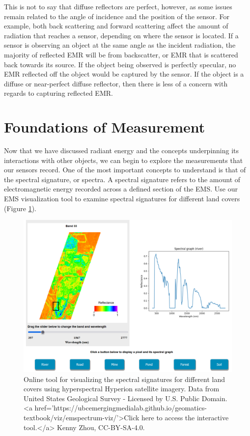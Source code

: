 \documentclass[
]{book}
\begin{document}
This is not to say that diffuse reflectors are perfect, however, as some issues remain related to the angle of incidence and the position of the sensor. For example, both back scattering and forward scattering affect the amount of radiation that reaches a sensor, depending on where the sensor is located. If a sensor is observing an object at the same angle as the incident radiation, the majority of reflected EMR will be from backscatter, or EMR that is scattered back towards its source. If the object being observed is perfectly specular, no EMR reflected off the object would be captured by the sensor. If the object is a diffuse or near-perfect diffuse reflector, then there is less of a concern with regards to capturing reflected EMR.

\section{Foundations of Measurement}\label{foundations-of-measurement}

Now that we have discussed radiant energy and the concepts underpinning its interactions with other objects, we can begin to explore the measurements that our sensors record. One of the most important concepts to understand is that of the spectral signature, or spectra. A spectral signature refers to the amount of electromagnetic energy recorded across a defined section of the EMS. Use our EMS visualization tool to examine spectral signatures for different land covers (Figure \ref{fig:11-ems-visualization-static}).

\begin{figure}
\includegraphics[width=0.75\linewidth]{images/11-ems-visualization-static} \caption{Online tool for visualizing the spectral signatures for different land covers using hyperspectral Hyperion satellite imagery. Data from United States Geological Survey - Licensed by U.S. Public Domain. <a href='https://ubcemergingmedialab.github.io/geomatics-textbook/viz/emspectrum-viz/'>Click here to access the interactive tool.</a> Kenny Zhou, CC-BY-SA-4.0.}\label{fig:11-ems-visualization-static}
\end{figure}
\end{document}
